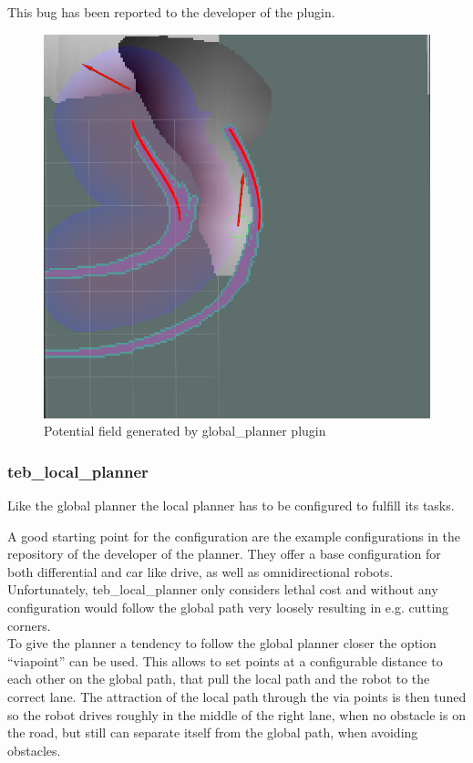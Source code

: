  This bug has been reported to the developer of the plugin. 
 \begin{figure}[H]
 	\centering
 	\includegraphics[width=.7\textwidth]{Pictures/out of bounds}	
 	
 	\caption{Potential field generated by global\_planner plugin}
 	\label{potentialfield}
 \end{figure}
 
 \subsubsection{teb\_local\_planner}
Like the global planner the local planner has to be configured to fulfill its tasks.

A good starting point for the configuration are the example configurations in the repository of the developer of the planner\cite{tebtutorials}. They offer a base configuration for both differential and car like drive, as well as omnidirectional robots.\\

Unfortunately, teb\_local\_planner only considers lethal cost and without any configuration would follow the global path very loosely resulting in e.g. cutting corners.\\ 

To give the planner a tendency to follow the global planner closer the option ``viapoint'' can be used. This allows to set points at a configurable distance to each other on the global path, that pull the local path and the robot to the correct lane. The attraction of the local path through the via points is then tuned so the robot drives roughly in the middle of the right lane, when no obstacle is on the road, but still can separate itself from the global path, when avoiding obstacles.\\

